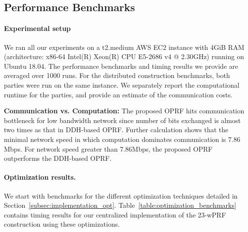\subsection{Performance Benchmarks}
\paragraph{Experimental setup}
We ran all our experiments on a t2.medium AWS EC2 instance with 4GiB RAM (architecture: x86-64 Intel(R) Xeon(R) CPU E5-2686 v4 @ 2.30GHz) running on Ubuntu 18.04. The performance benchmarks and timing results we provide are averaged over 1000 runs. For the distributed construction benchmarks, both parties were run on the same instance. We separately report the computational runtime for the parties, and provide an estimate of the communication costs. 

\textbf{Communication vs. Computation:} The proposed OPRF hits communication bottleneck for low bandwidth network since number of bits exchanged is almost two times as that in DDH-based OPRF\cite{LibSodium}. Further calculation shows that the minimal network speed in which computation dominates communication is 7.86 Mbps. For network speed greater than 7.86Mbps, the proposed OPRF outperforms the DDH-based OPRF.

\paragraph{Optimization results.}
We start with benchmarks for the different optimization techniques detailed in Section~\ref{subsec:implementation_opt}. Table~\ref{table:optimization_benchmarks} contains timing results for our centralized implementation of the 23-wPRF construction using these optimizations.

